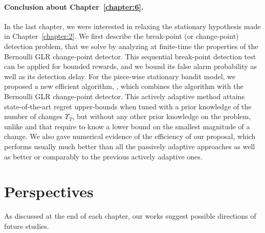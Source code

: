 \paragraph{Conclusion about \textbf{Chapter~\ref{chapter:6}}.}

In the last chapter, we were interested in relaxing the stationary hypothesis made in Chapter~\ref{chapter:2}.
%
We first describe the break-point (or change-point) detection problem, that we solve by analyzing at finite-time the properties of the Bernoulli GLR change-point detector.
This sequential break-point detection test can be applied for bounded rewards, and we bound its false alarm probability as well as its detection delay.
For the piece-wise stationary bandit model,
we proposed a new efficient algorithm, \GLRklUCB, which combines the \klUCB{} algorithm with the Bernoulli GLR change-point detector.
This actively adaptive method attains state-of-the-art regret upper-bounds when tuned with a prior knowledge of the number of changes $\Upsilon_T$, but without any other prior knowledge on the problem, unlike \CUSUMUCB{} and \MUCB{} that require to know a lower bound on the smallest magnitude of a change.
We also gave numerical evidence of the efficiency of our proposal, which performs usually much better than all the passively adaptive approaches as well as better or comparably to the previous actively adaptive ones.



\section{Perspectives}

As discussed at the end of each chapter,
our works suggest possible directions of future studies.





